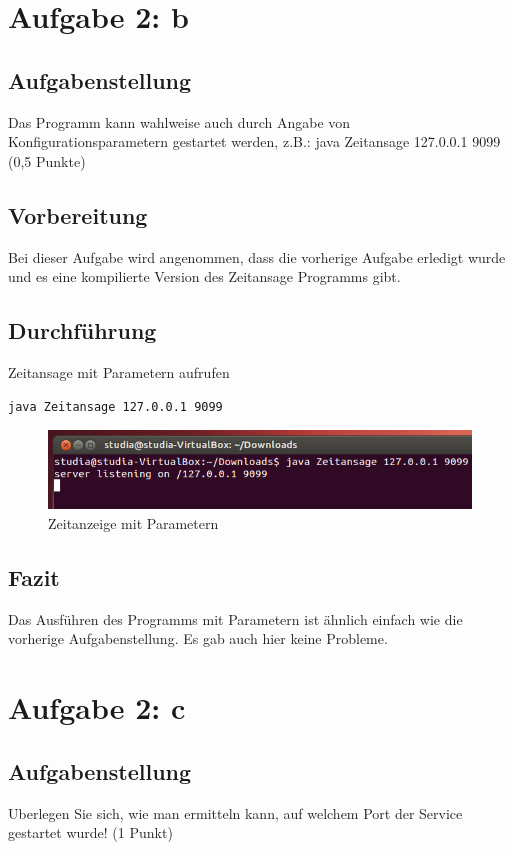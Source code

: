 \section{Aufgabe 2: b}

\subsection{Aufgabenstellung}
Das Programm kann wahlweise auch durch Angabe von Konfigurationsparametern gestartet
werden, z.B.: java Zeitansage 127.0.0.1 9099 (0,5 Punkte)

\subsection{Vorbereitung}
Bei dieser Aufgabe wird angenommen, dass die vorherige Aufgabe erledigt wurde und es eine kompilierte Version des Zeitansage Programms gibt.

\subsection{Durchführung}
Zeitansage mit Parametern aufrufen

\begin{lstlisting}
java Zeitansage 127.0.0.1 9099
\end{lstlisting}

\begin{figure}[H]
	\centering
	\includegraphics[width=0.4 \linewidth]{images/14}
	\caption{Zeitanzeige mit Parametern}
\end{figure}

\subsection{Fazit}
Das Ausführen des Programms mit Parametern ist ähnlich einfach wie die vorherige Aufgabenstellung. Es gab auch hier keine Probleme.

\section{Aufgabe 2: c}

\subsection{Aufgabenstellung}
Uberlegen Sie sich, wie man ermitteln kann, auf welchem Port der Service gestartet wurde! (1 Punkt)


